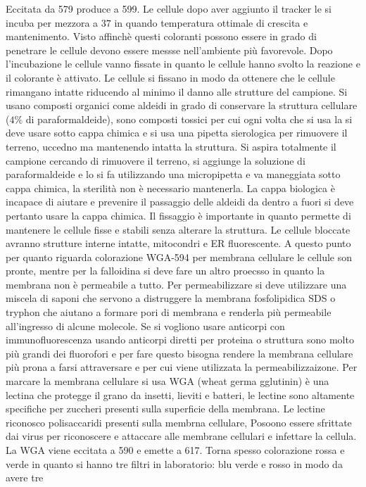 Eccitata da 579 produce a 599. Le cellule dopo aver aggiunto il tracker le si incuba per mezzora a $37$ in quando temperatura ottimale di crescita e mantenimento. Visto affinch\`e 
questi coloranti possono essere in grado di penetrare le cellule devono essere messse nell'ambiente pi\`u favorevole. Dopo l'incubazione le cellule vanno fissate in quanto le cellule
hanno svolto la reazione e il colorante \`e attivato. Le cellule si fissano in modo da ottenere che le cellule rimangano intatte riducendo al minimo il danno alle strutture del campione.
Si usano composti organici come aldeidi in grado di conservare la struttura cellulare ($4\%$ di paraformaldeide), sono composti tossici per cui ogni volta che si usa la si deve usare
sotto cappa chimica e si usa una pipetta sierologica per rimuovere il terreno, uccedno ma mantenendo intatta la struttura. Si aspira totalmente il campione cercando di rimuovere il 
terreno, si aggiunge la soluzione di paraformaldeide e lo si fa utilizzando una micropipetta e va maneggiata sotto cappa chimica, la sterilit\`a non \`e necessario mantenerla. La 
cappa biologica \`e incapace di aiutare e prevenire il passaggio delle aldeidi da dentro a fuori si deve pertanto usare la cappa chimica. Il fissaggio \`e importante in quanto permette
di mantenere le cellule fisse e stabili senza alterare la struttura. Le cellule bloccate avranno strutture interne intatte, mitocondri e ER fluorescente. A questo punto per quanto 
riguarda colorazione WGA-594 per membrana cellulare le cellule son pronte, mentre per la falloidina si deve fare un altro proecsso in quanto la membrana non \`e permeabile a tutto. Per
permeabilizzare si deve utilizzare una miscela di saponi che servono a distruggere la membrana fosfolipidica SDS o tryphon che aiutano a formare pori di membrana e renderla pi\`u 
permeabile all'ingresso di alcune molecole. Se si vogliono usare anticorpi con immunofluorescenza usando anticorpi diretti per proteina o struttura sono molto pi\`u grandi dei 
fluorofori e per fare questo bisogna rendere la membrana cellulare pi\`u prona a farsi attraversare e per cui viene utilizzata la permeabilizzaizone. Per marcare la membrana cellulare
si usa WGA (wheat germa gglutinin) \`e una lectina che protegge il grano da insetti, lieviti e batteri, le lectine sono altamente specifiche per zuccheri presenti sulla superficie 
della membrana. Le lectine riconosco polisaccaridi presenti sulla membrna cellulare, Posoono essere sfrittate dai virus per riconoscere e attaccare alle membrane cellulari e infettare
la cellula. La WGA viene eccitata a 590 e emette a 617. Torna spesso colorazione rossa e verde in quanto si hanno tre filtri in laboratorio: blu verde e rosso in modo da avere tre
